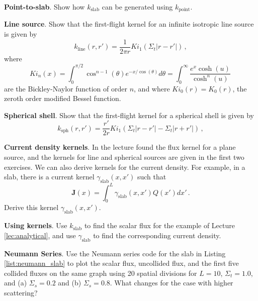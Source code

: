 \begin{exercises}
  
  \item \textbf{Point-to-slab}. Show how $k_{\text{slab}}$ can be generated using $k_{\text{point}}$.
  \item \textbf{Line source}. Show that the first-flight kernel for an infinite isotropic line source is given by
        \begin{equation}
         k_{\text{line}}(r,r') = \frac{1}{2\pi r}Ki_1(\Sigma_t|r-r'|) \, ,
         \label{eq:linekernel}
        \end{equation}
        where
        \begin{equation}
         Ki_n(x) = \int^{\pi/2}_0 \cos^{n-1}(\theta) e^{-x/\cos(\theta)}d\theta = \int^{\infty}_0 \frac{e^x \cosh(u)}{\cosh^n(u)} \, 
        \end{equation}
        are the Bickley-Naylor function of order $n$, and where $Ki_0(r) = K_0(r)$, the zeroth order modified Bessel function.

  \item \textbf{Spherical shell}. Show that the first-flight kernel for a spherical shell is given by
        \begin{equation}
         k_{\text{sph}}(r,r') = \frac{r'}{2r}Ki_1(\Sigma_t|r-r'|-\Sigma_t|r+r'|) \, ,
         \label{eq:sphericalkernel}
        \end{equation}

  \item \textbf{Current density kernels}. In the lecture found the flux kernel for a plane source, and the kernels for line and spherical sources are given in the first two exercises.  We can also derive kernels for the current density.  For example, in a slab, there is a current kernel $\gamma_{\text{slab}}(x,x')$ such that
  \begin{equation}
   \mathbf{J}(x) = \int^L_0 \gamma_{\text{slab}}(x,x') Q(x') dx' \, .
  \end{equation}
  Derive this kernel $\gamma_{\text{slab}}(x,x')$.
 
  \item \textbf{Using kernels}. Use $k_{\text{slab}}$ to find the scalar flux for the example of Lecture \ref{lec:analytical}, and use $\gamma_{\text{slab}}$ to find the corresponding current density.

  \item  \textbf{Neumann Series}. Use the Neumann series code for the slab in Listing \ref{list:neumann_slab} to plot the scalar flux, uncollided flux, and the first five collided fluxes on the same graph using 20 spatial divisions for $L = 10$, $\Sigma_t = 1.0$, and (a) $\Sigma_s = 0.2$ and (b) $\Sigma_s = 0.8$.  What changes for the case with higher scattering?


\end{exercises}
